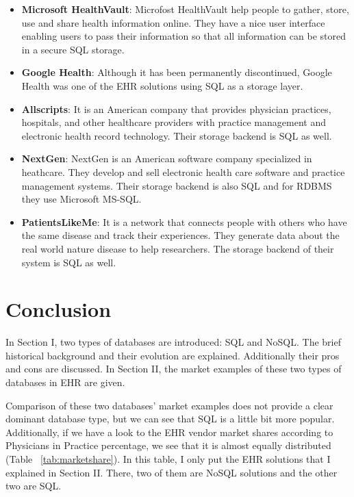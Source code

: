 \documentclass{article}
\begin{document}
\begin{itemize}
	\item \textbf{Microsoft HealthVault}: Microfost HealthVault help people to gather, store, use and share health information online\cite{online13}. They have a nice user interface enabling users to pass their information so that all information can be stored in a secure SQL storage\cite{online14}.
	\item \textbf{Google Health}: Although it has been permanently discontinued\cite{online15}, Google Health was one of the EHR solutions using SQL as a storage layer\cite{online16}.
	\item \textbf{Allscripts}: It is an American company that provides physician practices, hospitals, and other healthcare providers with practice management and electronic health record technology\cite{online21}. Their storage backend is SQL as well\cite{online22}.
	\item \textbf{NextGen}: NextGen is an American software company specialized in heathcare. They develop and sell electronic health care software and practice management systems\cite{online17}. Their storage backend is also SQL and for RDBMS they use Microsoft MS-SQL\cite{online18}.
	\item \textbf{PatientsLikeMe}: It is a network that connects people with others who have the same disease and track their experiences. They generate data about the real world nature disease to help researchers\cite{online19}. The storage backend of their system is SQL as well\cite{online20}. 
\end{itemize}

\section{Conclusion}
In Section I, two types of databases are introduced: SQL and NoSQL. The brief historical background and their evolution are explained. Additionally their pros and cons are discussed. In Section II, the market examples of these two types of databases in EHR are given.

Comparison of these two databases'  market examples does not provide a clear dominant database type, but we can see that SQL is a little bit more popular. Additionally, if we have a look to the EHR vendor market shares according to Physicians in Practice percentage, we see that it is almost equally distributed (Table ~\ref{tab:marketshare}). In this table, I only put the EHR solutions that I explained in Section II. There, two of them are NoSQL solutions and the other two are SQL. 
\end{document}
